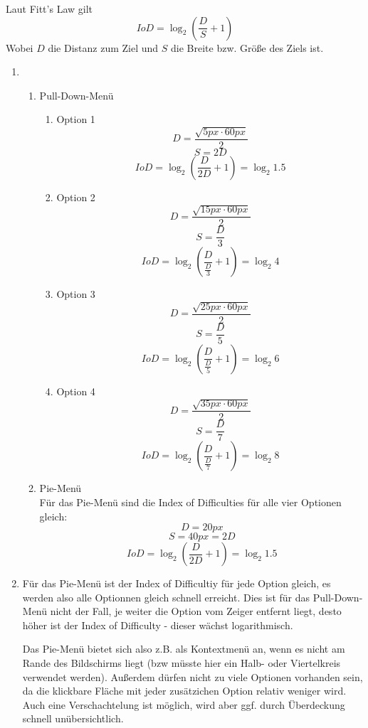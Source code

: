 \documentclass[a4paper,10pt]{article}
\begin{document}
\kopf
\renewcommand{\figurename}{Figure}

Laut Fitt's Law gilt
\[
	IoD = \log_2{\left(\frac{D}{S} + 1 \right)}
\]
Wobei $D$ die Distanz zum Ziel und $S$ die Breite bzw. Größe des Ziels ist.
\begin{enumerate}
	\item 
		\begin{enumerate}
			\item Pull-Down-Menü
			\begin{enumerate}
				\item Option 1
				 	\[ D =\frac{ \sqrt{5px \cdot 60px}}{2} \]
				 	\[ S = 2D \]
					\[ IoD = \log_2{\left(\frac{D}{2D} + 1 \right) = \log_2{1.5}}\]
				\item Option 2
				    \[ D =\frac{ \sqrt{15px\cdot 60px}}{2} \]
				    \[ S = \frac{D}{3} \]	
				    \[ IoD = \log_2{\left(\frac{D}{\frac{D}{3}} + 1 \right)} = \log_2{4} \]
				\item Option 3
					\[ D =\frac{ \sqrt{25px\cdot 60px}}{2} \]
					\[ S = \frac{D}{5} \]
					\[ IoD = \log_2{\left(\frac{D}{\frac{D}{5}} + 1 \right)} = \log_2{6} \]
				\item Option 4
					\[ D =\frac{ \sqrt{35px\cdot 60px}}{2} \]
					\[ S = \frac{D}{7} \]
					\[ IoD = \log_2{\left(\frac{D}{\frac{D}{7}} + 1 \right)} = \log_2{8} \]
			\end{enumerate}
				
			\item Pie-Menü\\
				Für das Pie-Menü sind die Index of Difficulties für alle vier Optionen gleich:
				\[ D = 20px \]
				\[ S = 40px = 2D \]
				\[ IoD = \log_2{\left(\frac{D}{2D} + 1 \right) = \log_2{1.5}}\]
				
			
		\end{enumerate}
	\item
		Für das Pie-Menü ist der Index of Difficultiy für jede Option gleich, es werden also alle Optionnen gleich schnell erreicht.
		Dies ist für das Pull-Down-Menü nicht der Fall, je weiter die Option vom Zeiger entfernt liegt, desto höher ist der Index of Difficulty - dieser wächst logarithmisch. 
		
		Das Pie-Menü bietet sich also z.B. als Kontextmenü an, wenn es nicht am Rande des Bildschirms liegt (bzw müsste hier ein Halb- oder Viertelkreis verwendet werden).
		Außerdem dürfen nicht zu viele Optionen vorhanden sein, da die klickbare Fläche mit jeder zusätzichen Option relativ weniger wird.
		Auch eine Verschachtelung ist möglich, wird aber ggf. durch Überdeckung schnell unübersichtlich.
\end{enumerate}
\end{document}
